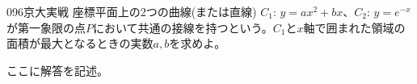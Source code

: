 \begin{thm}{096}{}{京大実戦}
 座標平面上の2つの曲線(または直線) $C_1$: $y=ax^2+bx$、$C_2$: $y=e^{-x}$が第一象限の点$P$において共通の接線を持つという。$C_1$と$x$軸で囲まれた領域の面積が最大となるときの実数$a, b$を求めよ。
\end{thm}

ここに解答を記述。